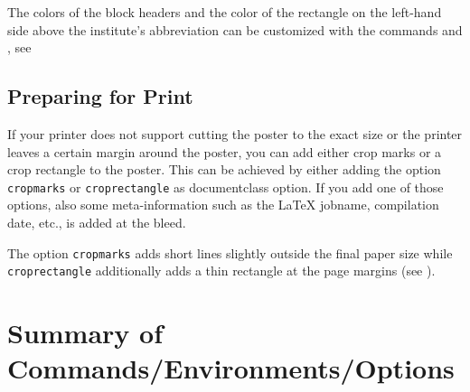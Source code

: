 The colors of the block headers and the color of the rectangle on the left-hand side above the institute's abbreviation can be customized with the commands \texttt{} and \texttt{}, see 



\subsection{Preparing for Print}

If your printer does not support cutting the poster to the exact size or the printer leaves a certain margin around the poster, you can add either crop marks or a crop rectangle to the poster. This can be achieved by either adding the option \texttt{cropmarks} or \texttt{croprectangle} as documentclass option. If you add one of those options, also some meta-information such as the \LaTeX{} jobname, compilation date, etc., is added at the bleed.

The option \texttt{cropmarks} adds short lines slightly outside the final paper size while \texttt{croprectangle} additionally adds a thin rectangle at the page margins (see ).

\section{Summary of Commands/Environments/Options}
\label{sec:reference}

